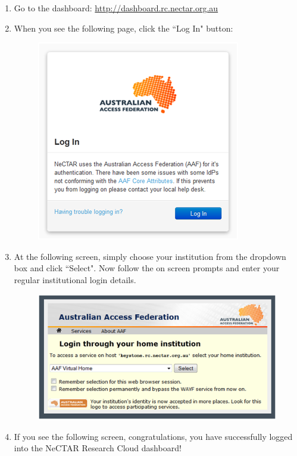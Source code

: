 \begin{enumerate}
  \item Go to the dashboard: \url{http://dashboard.rc.nectar.org.au}
  \item When you see the following page, click the ``Log In" button:
  \begin{figure}[H]
    \centering
    \includegraphics[scale=0.5]{post-workshop/nectar/aaf_login.png}
    \caption{\label{fig:aaf_login}}
  \end{figure}
  \item At the following screen, simply choose your institution from the
  dropdown box and click ``Select". Now follow the on screen prompts and enter
  your regular institutional login details.
  \begin{figure}[H]
    \centering
    \includegraphics[scale=0.5]{post-workshop/nectar/aaf_home_institute.png}
    \caption{\label{fig:aaf_home_institute}}
  \end{figure}
  \item If you see the following screen, congratulations, you have
  successfully logged into the NeCTAR Research Cloud dashboard!

\end{enumerate}
